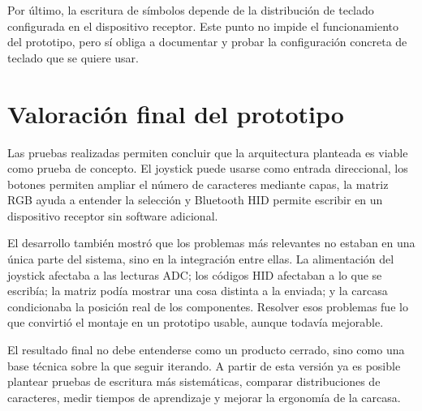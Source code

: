 Por último, la escritura de símbolos depende de la distribución de teclado configurada en el dispositivo receptor. Este punto no impide el funcionamiento del prototipo, pero sí obliga a documentar y probar la configuración concreta de teclado que se quiere usar.

\section{Valoración final del prototipo}
\label{sec:valoracion-prototipo}

Las pruebas realizadas permiten concluir que la arquitectura planteada es viable como prueba de concepto. El joystick puede usarse como entrada direccional, los botones permiten ampliar el número de caracteres mediante capas, la matriz RGB ayuda a entender la selección y Bluetooth HID permite escribir en un dispositivo receptor sin software adicional.

El desarrollo también mostró que los problemas más relevantes no estaban en una única parte del sistema, sino en la integración entre ellas. La alimentación del joystick afectaba a las lecturas ADC; los códigos HID afectaban a lo que se escribía; la matriz podía mostrar una cosa distinta a la enviada; y la carcasa condicionaba la posición real de los componentes. Resolver esos problemas fue lo que convirtió el montaje en un prototipo usable, aunque todavía mejorable.

El resultado final no debe entenderse como un producto cerrado, sino como una base técnica sobre la que seguir iterando. A partir de esta versión ya es posible plantear pruebas de escritura más sistemáticas, comparar distribuciones de caracteres, medir tiempos de aprendizaje y mejorar la ergonomía de la carcasa.
